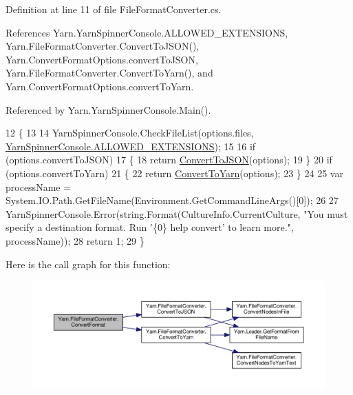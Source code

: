 Definition at line 11 of file File\-Format\-Converter.\-cs.



References Yarn.\-Yarn\-Spinner\-Console.\-A\-L\-L\-O\-W\-E\-D\-\_\-\-E\-X\-T\-E\-N\-S\-I\-O\-N\-S, Yarn.\-File\-Format\-Converter.\-Convert\-To\-J\-S\-O\-N(), Yarn.\-Convert\-Format\-Options.\-convert\-To\-J\-S\-O\-N, Yarn.\-File\-Format\-Converter.\-Convert\-To\-Yarn(), and Yarn.\-Convert\-Format\-Options.\-convert\-To\-Yarn.



Referenced by Yarn.\-Yarn\-Spinner\-Console.\-Main().


\begin{DoxyCode}
12         \{
13 
14             YarnSpinnerConsole.CheckFileList(options.files, 
      \hyperlink{a00195_a0979de7ea02c8c0375b8220a12e6575e}{YarnSpinnerConsole.ALLOWED\_EXTENSIONS});
15 
16             \textcolor{keywordflow}{if} (options.convertToJSON)
17             \{
18                 \textcolor{keywordflow}{return} \hyperlink{a00105_a28a086a7b44ecea7430af40436f38df6}{ConvertToJSON}(options);
19             \}
20             \textcolor{keywordflow}{if} (options.convertToYarn)
21             \{
22                 \textcolor{keywordflow}{return} \hyperlink{a00105_a1e6cd39b0c813f21da278367dcff76d2}{ConvertToYarn}(options);
23             \}
24 
25             var processName = System.IO.Path.GetFileName(Environment.GetCommandLineArgs()[0]);
26 
27             YarnSpinnerConsole.Error(string.Format(CultureInfo.CurrentCulture, \textcolor{stringliteral}{"You must specify a
       destination format. Run '\{0\} help convert' to learn more."}, processName));
28             \textcolor{keywordflow}{return} 1;
29         \}
\end{DoxyCode}


Here is the call graph for this function\-:
\nopagebreak
\begin{figure}[H]
\begin{center}
\leavevmode
\includegraphics[width=350pt]{a00105_aa4db4ccac799c5f047a8b1a9efbe109d_cgraph}
\end{center}
\end{figure}




